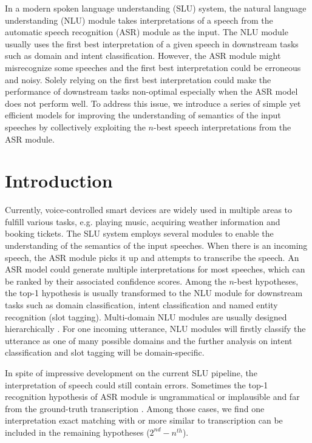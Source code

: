 In a modern spoken language understanding (SLU) system, the natural language understanding (NLU) module takes interpretations of a speech from the automatic speech recognition (ASR) module as the input. The NLU module usually uses the first best interpretation of a given speech in downstream tasks such as domain and intent classification. However, the ASR module might misrecognize some speeches and the first best interpretation could be erroneous and noisy. Solely relying on the first best interpretation could make the performance of downstream tasks non-optimal especially when the ASR model does not perform well. To address this issue, we introduce a series of simple yet efficient models for improving the understanding of semantics of the input speeches by collectively exploiting the $n$-best speech interpretations from the ASR module. 

\section{Introduction}
\label{alexa:intro}
Currently, voice-controlled smart devices are widely used in multiple areas to fulfill various tasks, e.g. playing music, acquiring weather information and booking tickets. 
The SLU system employs several modules to enable the understanding of the semantics of the input speeches. 
When there is an incoming speech, the ASR module picks it up and attempts to transcribe the speech.
An ASR model could generate multiple interpretations for most speeches, which can be ranked by their associated confidence scores.
Among the $n$-best hypotheses, the top-1 hypothesis is usually transformed to the NLU module for downstream tasks such as domain classification, intent classification and named entity recognition (slot tagging). Multi-domain NLU modules are usually designed hierarchically \citep{tur2011spoken}. For one incoming utterance, NLU modules will firstly classify the utterance as one of many possible domains and the further analysis on intent classification and slot tagging will be domain-specific.


In spite of impressive development on the current SLU pipeline, the interpretation of speech could still contain errors.
Sometimes the top-1 recognition hypothesis of ASR module is ungrammatical or implausible and far from the ground-truth transcription \citep{peng2013search, jyothi2012large}. 
Among those cases, we find one interpretation exact matching with or more similar to transcription can be included in the remaining hypotheses ($2^{nd}- n^{th}$). 

